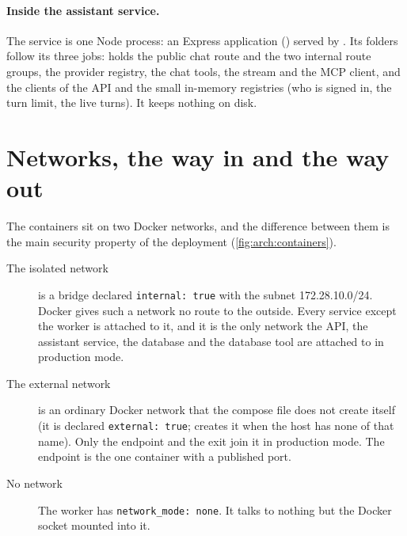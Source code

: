 \paragraph{Inside the assistant service.} The service is one Node process: an Express
application () served by . Its folders follow its three jobs:
 holds the public chat route and the two internal route groups,  the
provider registry, the chat tools, the stream and the MCP client, and  the
clients of the API and the small in-memory registries (who is signed in, the turn limit, the
live turns). It keeps nothing on disk.

\section{Networks, the way in and the way out}\label{sec:arch:network}

The containers sit on two Docker networks, and the difference between them is the main
security property of the deployment (\cref{fig:arch:containers}).

\begin{description}
  \item[The isolated network]  is a bridge declared \texttt{internal: true} with
    the subnet 172.28.10.0/24. Docker gives such a network no route to the outside. Every
    service except the worker is attached to it, and it is the only network the API, the
    assistant service, the database and the database tool are attached to in production
    mode.
  \item[The external network]  is an ordinary Docker network that the compose
    file does not create itself (it is declared \texttt{external: true};
     creates it when the host has none of that name). Only the
    endpoint and the exit join it in
    production mode. The endpoint is the one container with a published port.
  \item[No network] The worker has \texttt{network\_mode: none}. It talks to nothing but the
    Docker socket mounted into it.
\end{description}

